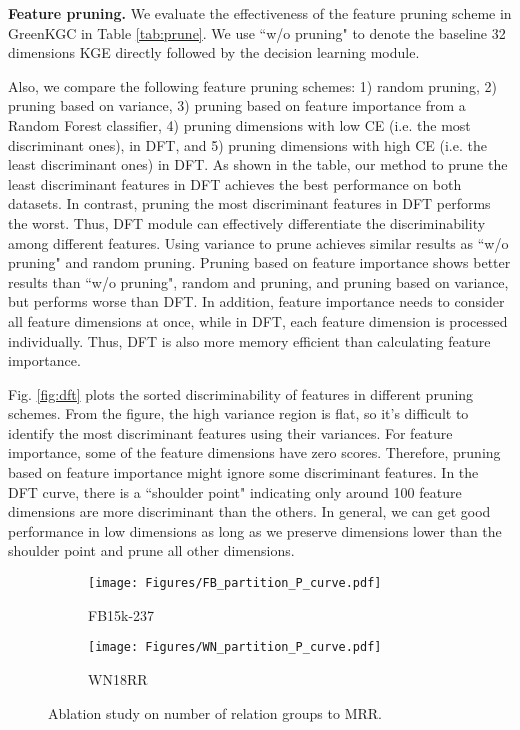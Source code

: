 \documentclass{article}
\begin{document}
\textbf{Feature pruning.} We evaluate the effectiveness
of the feature pruning scheme in GreenKGC in Table \ref{tab:prune}. We
use ``w/o pruning" to denote the baseline 32 dimensions KGE directly 
followed by the decision learning module. 
{\color{black}
Also, we compare the following feature pruning schemes: 1) random pruning, 
2) pruning based on variance, 3) pruning based on 
feature importance from a Random Forest classifier, 4) pruning dimensions 
with low CE (i.e. the most discriminant ones), in DFT, and 5) pruning 
dimensions with high CE (i.e. the least discriminant ones) in DFT.
As shown in the table, our method to prune the least discriminant features in
DFT achieves the best performance on both
datasets. In contrast, pruning the most discriminant features in DFT performs the worst. Thus, DFT module can effectively differentiate the discriminability among different features.
Using variance to prune achieves similar results as ``w/o pruning" and random pruning.
Pruning based on feature importance shows better results than ``w/o pruning", random 
and pruning, and pruning based on variance, but performs worse than DFT. In addition, feature
importance needs to consider all feature dimensions at once, while in DFT, each feature 
dimension is processed individually. Thus, DFT is also more memory efficient than calculating
feature importance.

Fig. \ref{fig:dft} plots the sorted discriminability of features in different pruning 
schemes. From the figure, the high variance region is flat, so it's difficult to identify the
most discriminant features using their variances. For feature importance, some of the feature
dimensions have zero scores. Therefore, pruning based on feature importance
might ignore some discriminant features. In the DFT curve, there is a ``shoulder point"
indicating only around 100 feature dimensions are more discriminant than the others. 
In general, we can get good performance in low dimensions as long as we preserve 
dimensions lower than the shoulder point and prune all other dimensions.
}
\begin{figure}[t]
\centering
     \begin{subfigure}[b]{0.48\textwidth}
         \centering
         \texttt{[image: Figures/FB\_partition\_P\_curve.pdf]}
         \caption{FB15k-237}
     \end{subfigure}
\begin{subfigure}[b]{0.48\textwidth}
         \centering
         \texttt{[image: Figures/WN\_partition\_P\_curve.pdf]}
         \caption{WN18RR}
     \end{subfigure}
\caption{\color{black}Ablation study on number of relation groups  to MRR.}\label{fig:partition}
\end{figure}
\end{document}
